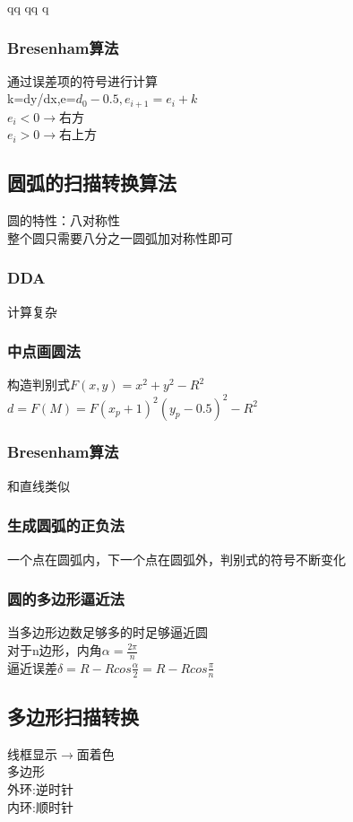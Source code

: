 qq	qq	q                                                                                                                                                                                                                                                                                      \documentclass{article}
\begin{document}
\begin{CJK}{UTF8}{gbsn}
	\subsubsection{Bresenham算法}
	通过误差项的符号进行计算\\
	k=dy/dx,e=$d_0-0.5,e_{i+1}=e_{i}+k$\\
	$e_{i}<0\rightarrow$右方\\
	$e_{i}>0\rightarrow$右上方\\
	\subsection{圆弧的扫描转换算法}
	圆的特性：八对称性\\
	整个圆只需要八分之一圆弧加对称性即可\\
	\subsubsection{DDA}
	计算复杂\\
	\subsubsection{中点画圆法}
	构造判别式$F(x,y)=x^2+y^2-R^2$\\
	$d=F(M)=F(x_p+1)^2(y_p-0.5)^2-R^2$\\
	\subsubsection{Bresenham算法}
	和直线类似\\
	\subsubsection{生成圆弧的正负法}
	一个点在圆弧内，下一个点在圆弧外，判别式的符号不断变化\\
	\subsubsection{圆的多边形逼近法}
	当多边形边数足够多的时足够逼近圆\\
	对于n边形，内角$\alpha=\frac{2\pi}{n}$\\
	逼近误差$\delta=R-Rcos\frac{\alpha}{2}=R-Rcos\frac{\pi}{n}$\\
	\subsection{多边形扫描转换}
	线框显示$\rightarrow$面着色\\
	多边形\\
	外环:逆时针\\
	内环:顺时针\\

\end{CJK}
\end{document}
